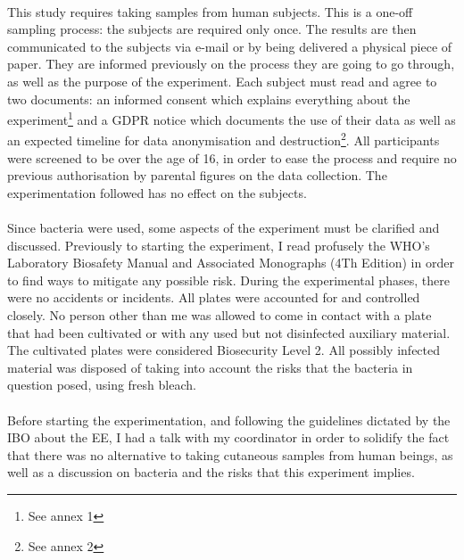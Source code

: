 \paragraph{}This study requires taking samples from  human subjects. This is a one-off sampling process: the subjects are required only once. The results are then communicated to the subjects via e-mail or by being delivered a physical piece of paper. They are informed previously on the process they are going to go through, as well as the purpose of the experiment. Each subject must read and agree to two documents: an informed consent which explains everything about the experiment\footnote{See annex 1} and a GDPR notice which documents the use of their data as well as an expected timeline for data anonymisation and destruction\footnote{See annex 2}. All participants were screened to be over the age of 16, in order to ease the process and require no previous authorisation by parental figures on the data collection. The experimentation followed has no effect on the subjects\cite{WhatGDPREU2018}.
\paragraph{}Since bacteria were used, some aspects of the experiment must be clarified and discussed. Previously to starting the experiment, I read profusely the WHO's Laboratory Biosafety Manual and Associated Monographs (4Th Edition)\cite{worldhealthorganizationLaboratoryBiosafetyManual2020} in order to find ways to mitigate any possible risk. During the experimental phases, there were no accidents or incidents. All plates were accounted for and controlled closely. No person other than me was allowed to come in contact with a plate that had been cultivated or with any used but not disinfected auxiliary material. The cultivated plates were considered Biosecurity Level 2. All possibly infected material was disposed of taking into account the risks that the bacteria in question posed, using fresh bleach.
\paragraph{}Before starting the experimentation, and following the guidelines dictated by the IBO about the EE, I had a talk with my coordinator in order to solidify the fact that there was no alternative to taking cutaneous samples from human beings, as well as a discussion on bacteria and the risks that this experiment implies.
